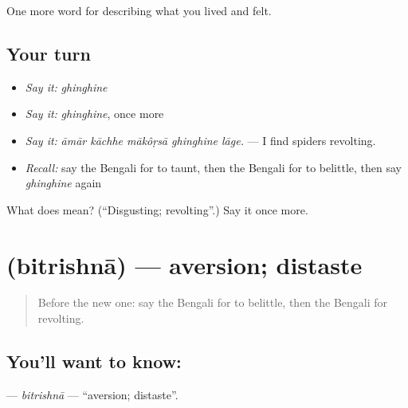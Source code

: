 \begin{grammarlens}[title={What you've built}]
One more word for describing what you lived and felt.
\end{grammarlens}

\subsection*{Your turn}
\begin{itemize}
\raggedright
  \item \emph{Say it:} \emph{ghinghine}
  \item \emph{Say it:} \emph{ghinghine}, once more
  \item \emph{Say it:} \emph{āmār kāchhe mākôṛsā ghinghine lāge.} — I find spiders revolting.
  \item \emph{Recall:} say the Bengali for to taunt, then the Bengali for to belittle, then say \emph{ghinghine} again
\end{itemize}

\begin{tcolorbox}[breakable,colback=teal!4,colframe=teal!35!black,title={Before you move on}]
What does  mean? (\textquotedblleft{}Disgusting; revolting\textquotedblright{}.) Say it once more.
\end{tcolorbox}
\section[\texorpdfstring{\bn{বিতৃষ্ণা} (bitrishnā)}{বিতৃষ্ণা (bitrishnā)}]{ (bitrishnā) — aversion; distaste}

\label{lesson:BN-C451-bitrishna}



\begin{quote}
Before the new one: say the Bengali for to belittle, then the Bengali for revolting.
\end{quote}

\subsection*{You'll want to know: }
\textbf{} — \emph{bitrishnā} — \textquotedblleft{}aversion; distaste\textquotedblright{}.

\begin{quote}
      
\end{quote}

